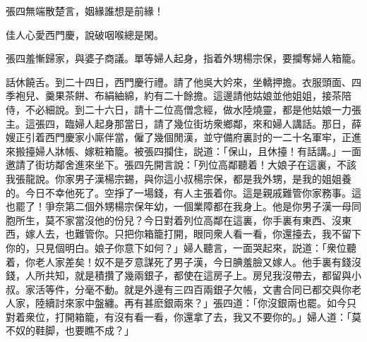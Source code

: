 \begin{myquote}
張四無端散楚言，姻緣誰想是前緣！

佳人心愛西門慶，說破咽喉總是閑。
\end{myquote}

張四羞慚歸家，與婆子商議。單等婦人起身，指着外甥楊宗保，要攔奪婦人箱籠。

話休饒舌。到二十四日，西門慶行禮。請了他吳大妗來，坐轎押擔。衣服頭面、四季袍兒、羹果茶餅、布絹紬綿，約有二十餘擔。這邊請他姑娘並他姐姐，接茶陪侍，不必細說。到二十六日，請十二位高僧念經，做水陸燒靈，都是他姑娘一力張主。這張四，臨婦人起身那當日，請了幾位街坊衆鄉鄰，來和婦人講話。那日，薛嫂正引着西門慶家小廝伴當，僱了幾個閒漢，並守備府裏討的一二十名軍牢，正進來搬擡婦人牀帳、嫁粧箱籠。被張四攔住，説道：「保山，且休擡！有話講。」一面邀請了街坊鄰舍進來坐下。張四先開言說：「列位高鄰聽着！大娘子在這裏，不該我張龍說。你家男子漢楊宗錫，與你這小叔楊宗保，都是我外甥，是我的姐姐養的。今日不幸他死了。空掙了一場錢，有人主張着你。這是親戚難管你家務事。這也罷了！爭奈第二個外甥楊宗保年幼，一個業障都在我身上。他是你男子漢一母同胞所生，莫不家當沒他的份兒？今日對着列位高鄰在這裏，你手裏有東西、沒東西，嫁人去，也難管你。只把你箱籠打開，眼同衆人看一看，你還擡去，我不留下你的，只見個明白。娘子你意下如何？」婦人聽言，一面哭起來，説道：「衆位聽着，你老人家差矣！奴不是歹意謀死了男子漢，今日腆羞臉又嫁人。他手裏有錢沒錢，人所共知，就是積攢了幾兩銀子，都使在這房子上。房兒我沒帶去，都留與小叔。家活等件，分毫不動。就是外邊有三四百兩銀子欠帳，文書合同已都交與你老人家，陸續討來家中盤纏。再有甚麽銀兩來？」張四道：「你沒銀兩也罷。如今只對着衆位，打開箱籠，有沒有看一看，你還拿了去，我又不要你的。」婦人道：「莫不奴的鞋脚，也要瞧不成？」

